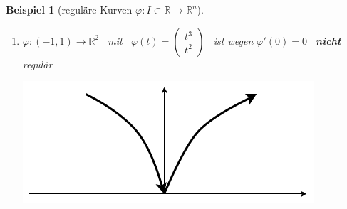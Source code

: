 \documentclass[a4paper,12pt,portrait]{book}
\theoremstyle{theoremstyle}
\newtheorem{beispiel}[theo]{Beispiel}
\begin{document}
\begin{beispiel}[reguläre Kurven $\varphi:I\subset\mathbb{R}\rightarrow\mathbb{R}^n$]
\begin{enumerate}
\begin{center}
\end{center}
$\varphi(\pm\frac{2\pi}{3})=\begin{pmatrix}
0 \\ 0
\end{pmatrix}, \ \varphi(0)=\begin{pmatrix}
3 \\ 0
\end{pmatrix}$\\
$\begin{pmatrix}
1 \\ 0
\end{pmatrix}$ \ gehört \textbf{nicht} zur Kurve ("$=\varphi(\pm\pi)$") und $\varphi$ ist regulär.
\item $\varphi:(-1,1)\rightarrow\mathbb{R}^2$ \ mit \ $\varphi(t)=\begin{pmatrix}
t^3 \\ t^2
\end{pmatrix}$ \ ist wegen $\varphi'(0)=0$ \ \textbf{nicht} regulär\\
\begin{center}
\includegraphics[scale=0.3]{pictures/MA2_0004}
\end{center}
\end{enumerate}
\end{beispiel}
\ \linebreak
\end{document}
